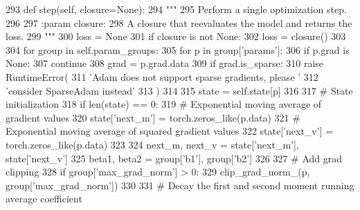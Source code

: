 \begin{DoxyCode}
293     \textcolor{keyword}{def }step(self, closure=None):
294         \textcolor{stringliteral}{"""}
295 \textcolor{stringliteral}{        Perform a single optimization step.}
296 \textcolor{stringliteral}{}
297 \textcolor{stringliteral}{        :param closure:}
298 \textcolor{stringliteral}{            A closure that reevaluates the model and returns the loss.}
299 \textcolor{stringliteral}{        """}
300         loss = \textcolor{keywordtype}{None}
301         \textcolor{keywordflow}{if} closure \textcolor{keywordflow}{is} \textcolor{keywordflow}{not} \textcolor{keywordtype}{None}:
302             loss = closure()
303 
304         \textcolor{keywordflow}{for} group \textcolor{keywordflow}{in} self.param\_groups:
305             \textcolor{keywordflow}{for} p \textcolor{keywordflow}{in} group[\textcolor{stringliteral}{'params'}]:
306                 \textcolor{keywordflow}{if} p.grad \textcolor{keywordflow}{is} \textcolor{keywordtype}{None}:
307                     \textcolor{keywordflow}{continue}
308                 grad = p.grad.data
309                 \textcolor{keywordflow}{if} grad.is\_sparse:
310                     \textcolor{keywordflow}{raise} RuntimeError(
311                         \textcolor{stringliteral}{'Adam does not support sparse gradients, please '}
312                         \textcolor{stringliteral}{'consider SparseAdam instead'}
313                     )
314 
315                 state = self.state[p]
316 
317                 \textcolor{comment}{# State initialization}
318                 \textcolor{keywordflow}{if} len(state) == 0:
319                     \textcolor{comment}{# Exponential moving average of gradient values}
320                     state[\textcolor{stringliteral}{'next\_m'}] = torch.zeros\_like(p.data)
321                     \textcolor{comment}{# Exponential moving average of squared gradient values}
322                     state[\textcolor{stringliteral}{'next\_v'}] = torch.zeros\_like(p.data)
323 
324                 next\_m, next\_v = state[\textcolor{stringliteral}{'next\_m'}], state[\textcolor{stringliteral}{'next\_v'}]
325                 beta1, beta2 = group[\textcolor{stringliteral}{'b1'}], group[\textcolor{stringliteral}{'b2'}]
326 
327                 \textcolor{comment}{# Add grad clipping}
328                 \textcolor{keywordflow}{if} group[\textcolor{stringliteral}{'max\_grad\_norm'}] > 0:
329                     clip\_grad\_norm\_(p, group[\textcolor{stringliteral}{'max\_grad\_norm'}])
330 
331                 \textcolor{comment}{# Decay the first and second moment running average coefficient}

\end{DoxyCode}
